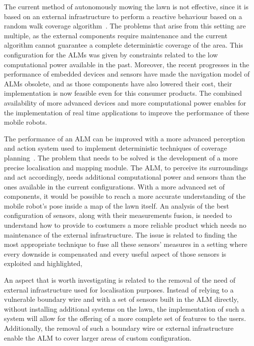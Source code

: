 \noindent
The current method of autonomously mowing the lawn is not effective, since it is based on an external infrastructure to perform a reactive behaviour based on a random walk coverage algorithm~\cite{karol_ardic_conditional_2016}.
The problems that arise from this setting are multiple, as the external components require maintenance and the current algorithm cannot guarantee a complete deterministic coverage of the area.
This configuration for the \glspl{ALM} was given by constraints related to the low computational power available in the past.
Moreover, the recent progresses in the performance of embedded devices and sensors have made the navigation model of \glspl{ALM} obsolete, and as those components have also lowered their cost, their implementation is now feasible even for this consumer products.
The combined availability of more advanced devices and more computational power enables for the implementation of real time applications to improve the performance of these mobile robots.


The performance of an \gls{ALM} can be improved with a more advanced perception and action system used to implement deterministic techniques of coverage planning~\cite{autonomous-yasuda}.
The problem that needs to be solved is the development of a more precise localisation and mapping module.
The \gls{ALM}, to perceive its surroundings and act accordingly, needs additional computational power and sensors than the ones available in the current configurations.
With a more advanced set of components, it would be possible to reach a more accurate understanding of the mobile robot's pose inside a map of the lawn itself.
An analysis of the best configuration of sensors, along with their measurements fusion, is needed to understand how to provide to costumers a more reliable product which needs no maintenance of the external infrastructure.
The issue is related to finding the most appropriate technique to fuse all these sensors' measures in a setting where every downside is compensated and every useful aspect of those sensors is exploited and highlighted,


An aspect that is worth investigating is related to the removal of the need of external infrastructure used for localisation purposes.
Instead of relying to a vulnerable boundary wire and with a set of sensors built in the \gls{ALM} directly, without installing additional systems on the lawn, the implementation of such a system will allow for the offering of a more complete set of features to the users.
Additionally, the removal of such a boundary wire or external infrastructure enable the \gls{ALM} to cover larger areas of custom configuration.

